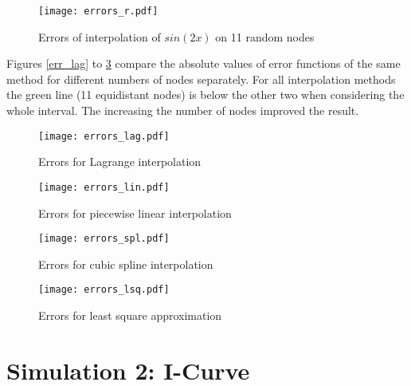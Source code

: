 \documentclass[a4paper,10pt]{article}
\begin{document}
\begin{figure}[h!]
\centering
\texttt{[image: errors\_r.pdf]}
\caption{Errors of interpolation of $sin(2x)$ on 11 random nodes}
\label{11nodesranderr}
\end{figure}

Figures \ref{err_lag} to \ref{err_lsq} compare the absolute values of error functions of the same method for different numbers of nodes separately.
For all interpolation methods the green line (11 equidistant nodes) is below the other two when considering the whole interval. The increasing the number of nodes improved the result.

\begin{figure}[h!]
        \begin{minipage}[b]{0.5\linewidth}
            \centering
            \texttt{[image: errors\_lag.pdf]}
            \caption{Errors for Lagrange interpolation}
            \label{err_lag}
        \end{minipage}
        \hspace{0.5cm}
        \begin{minipage}[b]{0.5\linewidth}
            \centering
            \texttt{[image: errors\_lin.pdf]}
            \caption{Errors for piecewise linear interpolation}
            \label{err_lin}
        \end{minipage}
    \end{figure}

\begin{figure}[h!]
        \begin{minipage}[b]{0.5\linewidth}
            \centering
            \texttt{[image: errors\_spl.pdf]}
            \caption{Errors for cubic spline interpolation}
            \label{err_spl}
        \end{minipage}
        \hspace{0.5cm}
        \begin{minipage}[b]{0.5\linewidth}
            \centering
            \texttt{[image: errors\_lsq.pdf]}
            \caption{Errors for least square approximation}
            \label{err_lsq}
        \end{minipage}
    \end{figure}


\section{Simulation 2: I-Curve}
\end{document}
